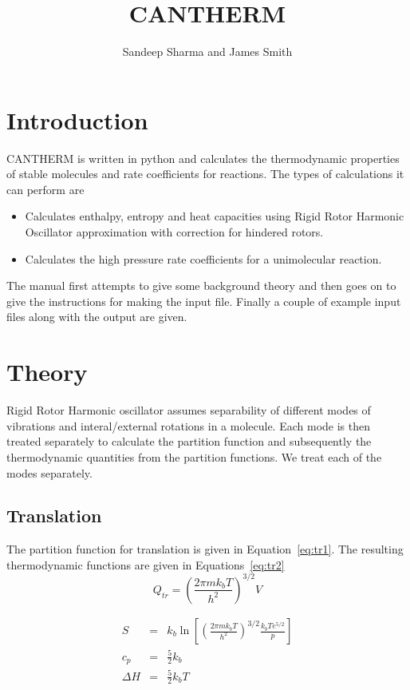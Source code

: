 \documentclass[a4paper,12pt]{article}
\title{CANTHERM}
\author{Sandeep Sharma and James Smith}
\begin{document}
 \maketitle
\tableofcontents
\section{Introduction}
CANTHERM is written in python and calculates the thermodynamic properties of stable molecules and rate coefficients for reactions. The types of calculations it can perform are
\begin{itemize}
 \item Calculates enthalpy, entropy and heat capacities using Rigid Rotor Harmonic Oscillator approximation with correction for hindered rotors.
\item Calculates the high pressure rate coefficients for a unimolecular reaction.
\end{itemize}
The manual first attempts to give some background theory and then goes on to give the instructions for making the input file. Finally a couple of example input files along with the output are given.

\section{Theory}
Rigid Rotor Harmonic oscillator assumes separability of different modes of vibrations and interal/external rotations in a molecule. Each mode is then treated separately to calculate the partition function and subsequently the thermodynamic quantities from the partition functions. We treat each of the modes separately.
\subsection{Translation}
The partition function for translation is given in Equation~\ref{eq:tr1}. The resulting thermodynamic functions are given in Equations~\ref{eq:tr2}
\begin{equation}
 Q_{tr} = \left(\frac{2\pi m k_bT}{h^2}\right)^{3/2}V
\label{eq:tr1}
\end{equation}

\begin{eqnarray}
 S%
&=&k_b \ln\left[\left(\frac{2\pi m k_bT}{h^2}\right)^{3/2} \frac{k_bTe^{5/2}}{p}\right]\nonumber\\
c_p&=& \frac{5}{2}k_b \nonumber \\
\Delta H&=& \frac{5}{2}k_bT
\label{eq:tr2}
\end{eqnarray}
\end{document}
